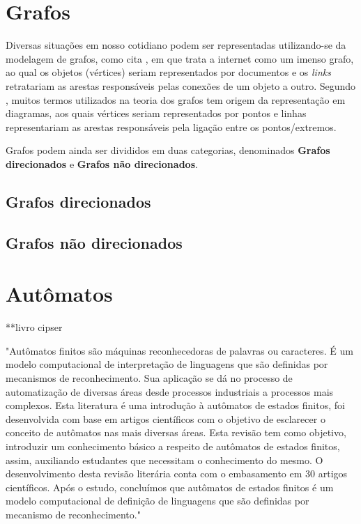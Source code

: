 \documentclass[a4paper,12pt,portuguese]{ufms-cpcx}
\begin{document}
\section{ Grafos} %

Diversas situações em nosso cotidiano podem ser representadas utilizando-se da modelagem de grafos, como cita \cite{ziviani2013}, em que trata a internet como um imenso grafo, ao qual os objetos (vértices) seriam representados por documentos e os \textit{links} retratariam as arestas responsáveis pelas conexões de um objeto a outro. Segundo \cite{jurkiewicz2009grafos}, muitos termos utilizados na teoria dos grafos tem origem da representação em diagramas, aos quais vértices seriam representados por pontos e linhas representariam as arestas responsáveis pela ligação entre os pontos/extremos.

Grafos podem ainda ser divididos em duas categorias, denominados \textbf{Grafos direcionados} e \textbf{Grafos não  direcionados}.

\subsection{Grafos direcionados}

\subsection{Grafos não direcionados}
	
\section{ Autômatos} %

**livro cipser

\cite{AllanPatrickDosSantos2017ADEF} "Autômatos finitos são máquinas reconhecedoras de palavras ou caracteres. É um modelo computacional de interpretação de linguagens que são definidas por mecanismos de reconhecimento. Sua aplicação se dá no processo de automatização de diversas áreas desde processos industriais a processos mais complexos. Esta literatura é uma introdução à autômatos de estados finitos, foi desenvolvida com base em artigos científicos com o objetivo de esclarecer o conceito de autômatos nas mais diversas áreas. Esta revisão tem como objetivo, introduzir um conhecimento básico a respeito de autômatos de estados finitos, assim, auxiliando estudantes que necessitam o conhecimento do mesmo. O desenvolvimento desta revisão literária conta com o embasamento em 30 artigos científicos. Após o estudo, concluímos que autômatos de estados finitos é um modelo computacional de definição de linguagens que são definidas por mecanismo de reconhecimento."
\end{document}
